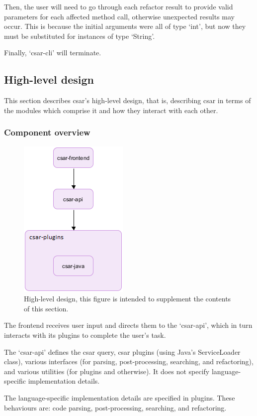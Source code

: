 \documentclass[12pt, letterpaper]{article}
\begin{document}
Then, the user will need to go through each refactor result to provide valid parameters for each affected method call, otherwise unexpected results may occur.
This is because the initial arguments were all of type `int', but now they must be substituted for instances of type `String'.

Finally, `csar-cli' will terminate.

\subsection{High-level design}
This section describes csar's high-level design, that is, describing csar in terms of the modules which comprise it and how they interact with each other.

\subsubsection{Component overview}
\begin{figure}[!hb]
  \centering
  \caption{High-level design, this figure is intended to supplement the contents of this section.}
  \includegraphics{figure-1}
\end{figure}

The frontend receives user input and directs them to the `csar-api', which in turn interacts with its plugins to complete the user's task.

The `csar-api' defines the csar query, csar plugins (using Java's ServiceLoader class), various interfaces (for parsing, post-processing, searching, and refactoring), and various utilities (for plugins and otherwise).
It does not specify language-specific implementation details.

The language-specific implementation details are specified in plugins.
These behaviours are: code parsing, post-processing, searching, and refactoring.
\end{document}
